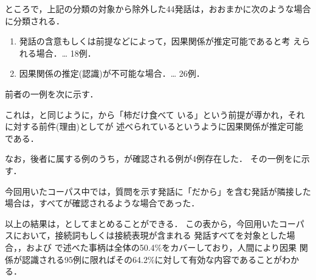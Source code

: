 ところで，上記の分類の対象から除外した44発話は，おおまかに次のような場合
に分類される．

\begin{enumerate}
 \item 発話の含意もしくは前提などによって，因果関係が推定可能であると考
       えられる場合．… 18例．
 \item 因果関係の推定(認識)が不可能な場合．… 26例．
\end{enumerate}

前者の一例を次に示す．



これは，と同じように，から「柿だけ食べて
いる」という前提が導かれ，それに対する前件(理由)としてが
述べられているというように因果関係が推定可能である．

なお，後者に属する例のうち，が確認される例が4例存在した．
その一例をに示す．


今回用いたコーパス中では，質問を示す発話に「だから」を含む発話が隣接した
場合は，すべてが確認されるような場合であった．

以上の結果は，としてまとめることができる．
この表から，今回用いたコーパスにおいて，接続詞もしくは接続表現が含まれる
発話すべてを対象とした場合，，および
で述べた事柄は全体の50.4\%をカバーしており，人間により因果
関係が認識される95例に限ればその64.2\%に対して有効な内容であることがわか
る．


